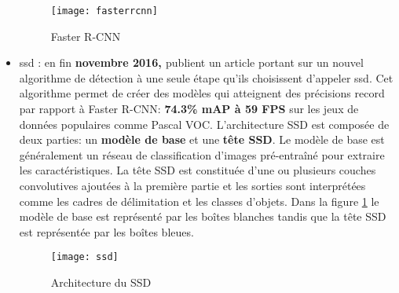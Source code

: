 \begin{itemize}
                \begin{figure}[H]
                    \centering
                    \texttt{[image: fasterrcnn]}
                    \caption{Faster R-CNN}
                \end{figure}
            \item \acrfull{ssd} :  en fin \textbf{novembre 2016, \citeauthor{ssd}} publient un article portant sur un nouvel algorithme de détection à une seule étape qu’ils choisissent d’appeler \acrshort{ssd}. Cet algorithme permet de créer des modèles qui atteignent des précisions record par rapport à Faster R-CNN: \textbf{74.3\% mAP à 59 FPS} \cite{ssd} sur les jeux de données populaires comme Pascal VOC. L’architecture SSD est composée de deux parties: un \textbf{modèle de base} et une \textbf{tête SSD}. Le modèle de base est généralement un réseau de classification d'images pré-entraîné pour extraire les caractéristiques. La tête SSD est constituée d’une ou plusieurs couches convolutives ajoutées à la première partie et les sorties sont interprétées comme les cadres de délimitation et les classes d'objets. Dans la figure \ref{fig:ssd} le modèle de base est représenté par les boîtes blanches tandis que la tête SSD est représentée par les boîtes bleues.
                \begin{figure}[H]
                    \centering
                    \texttt{[image: ssd]}
                    \caption{Architecture du SSD}
                    \label{fig:ssd}
                \end{figure}


\end{itemize}

